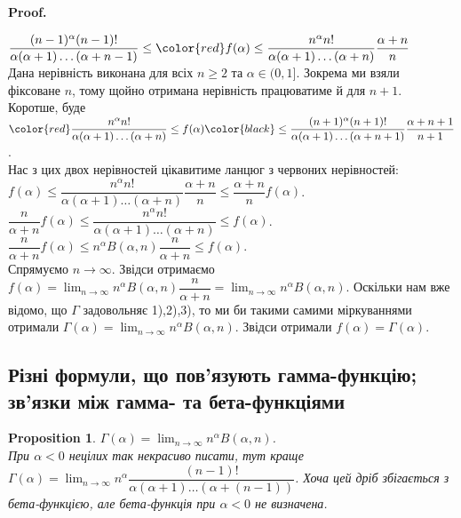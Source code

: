 \documentclass[a4paper, 10pt]{article}
\makeatletter
\theoremstyle{theoremdd}
\theoremstyle{theoremdd}
\theoremstyle{theoremdd}
\theoremstyle{theoremdd}
\theoremstyle{theoremdd}
\theoremstyle{theoremdd}
\newtheorem{proposition}[theorem]{Proposition}
\theoremstyle{theoremdd}
\theoremstyle{theoremdd}
\theoremstyle{theoremdd}
\renewenvironment{proof}[1][Proof.\\]{\par
\pushQED{\hfill \qed}%
\normalfont \topsep6\p@\@plus6\p@\relax
\trivlist
\item\relax
{\bfseries
#1\@addpunct{.}}\hspace\labelsep\ignorespaces
}{%
\popQED\endtrivlist\@endpefalse
}
\makeatother
\begin{document}
\begin{proof}
$\dfrac{(n-1)^\alpha (n-1)!}{\alpha (\alpha+1) \dots (\alpha+n-1)} \leq \color{red}f(\alpha) \leq \dfrac{n^\alpha n!}{\alpha (\alpha+1) \dots (\alpha+n)} \dfrac{\alpha + n}{n}$\\
Дана нерівність виконана для всіх $n \geq 2$ та $\alpha \in (0,1]$. Зокрема ми взяли фіксоване $n$, тому щойно отримана нерівність працюватиме й для $n+1$. Коротше, буде\\
$\color{red}\dfrac{n^\alpha n!}{\alpha (\alpha+1) \dots (\alpha+n)} \leq f(\alpha) \color{black}\leq \dfrac{(n+1)^\alpha (n+1)!}{\alpha (\alpha+1) \dots (\alpha+n+1)} \dfrac{\alpha + n+1}{n+1}$.\\
Нас з цих двох нерівностей цікавитиме ланцюг з червоних нерівностей:\\
$f(\alpha) \leq \dfrac{n^\alpha n!}{\alpha (\alpha+1)\dots (\alpha+n)} \dfrac{\alpha+n}{n} \leq \dfrac{\alpha+n}{n}f(\alpha)$.\\
$\dfrac{n}{\alpha+n} f(\alpha) \leq \dfrac{n^\alpha n!}{\alpha (\alpha+1) \dots (\alpha+n)} \leq f(\alpha)$.\\
$\dfrac{n}{\alpha+n} f(\alpha) \leq n^\alpha B(\alpha,n) \dfrac{n}{\alpha+n} \leq f(\alpha)$.\\
Спрямуємо $n \to \infty$. Звідси отримаємо $f(\alpha) = \displaystyle\lim_{n \to \infty} n^\alpha B(\alpha,n) \dfrac{n}{\alpha+n} = \lim_{n \to \infty} n^\alpha B(\alpha,n)$. Оскільки нам вже відомо, що $\Gamma$ задовольняє 1),2),3), то ми би такими самими міркуваннями отримали $\Gamma(\alpha) = \displaystyle\lim_{n \to \infty} n^\alpha B(\alpha,n)$. Звідси отримали $f(\alpha) = \Gamma(\alpha)$.
\end{proof}

\subsection{Різні формули, що пов'язують гамма-функцію; зв'язки між гамма- та бета-функціями}
\begin{proposition}
$\Gamma(\alpha) = \displaystyle\lim_{n \to \infty} n^\alpha B(\alpha,n)$.\\
\textit{При $\alpha < 0$ нецілих так некрасиво писати, тут краще $\Gamma(\alpha) = \displaystyle\lim_{n \to \infty} n^\alpha \dfrac{(n-1)!}{\alpha(\alpha+1) \dots (\alpha+(n-1))}$. Хоча цей дріб збігається з бета-функцією, але бета-функція при $\alpha <0$ не визначена.}
\end{proposition}
\end{document}
